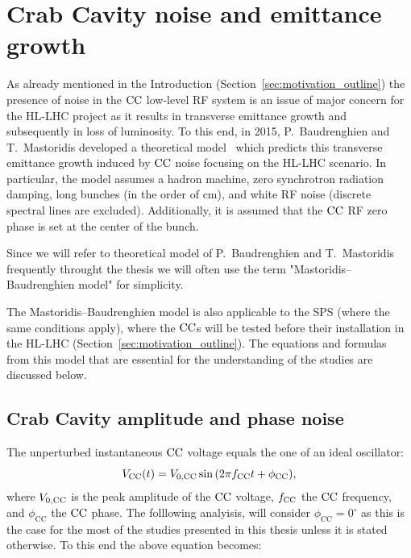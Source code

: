 

\section{Crab Cavity noise and emittance growth}\label{sec:CC_noise_intro}
As already mentioned in the Introduction (Section~\ref{sec:motivation_outline}) the presence of noise in the ${\mathrm{CC}}$ low-level RF system is an issue of major concern for the HL-LHC project as it results in transverse emittance growth and subsequently in loss of luminosity. To this end, in 2015, P.~Baudrenghien and T.~Mastoridis developed a theoretical model~\cite{PhysRevSTAB.18.101001} which predicts this transverse emittance growth induced by ${\mathrm{CC}}$ noise focusing on the HL-LHC scenario. In particular, the model assumes a hadron machine, zero synchrotron radiation damping, long bunches (in the order of cm), and white RF noise (discrete spectral lines are excluded). Additionally, it is assumed that the ${\mathrm{CC}}$ RF zero phase is set at the center of the bunch.

Since we will refer to theoretical model of P.~Baudrenghien and T.~Mastoridis ~\cite{PhysRevSTAB.18.101001} frequently throught the thesis we will often use the term "Mastoridis--Baudrenghien model" for simplicity.

The Mastoridis--Baudrenghien model is also applicable to the SPS (where the same conditions apply), where the ${\mathrm{CC}}$s will be tested before their installation in the HL-LHC (Section~\ref{sec:motivation_outline}). The equations and formulas from this model that are essential for the understanding of the studies are discussed below.




\subsection{Crab Cavity amplitude and phase noise}\label{subsec:AN_PN}
The unperturbed instantaneous ${\mathrm{CC}}$ voltage equals the one of an ideal oscillator:
\begin{equation}\label{eq:CC_voltage_t_phase}
    V_\mathrm{CC}(t) = {V_\mathrm{0, CC}} \sin{\left ( 2 \pi {f_\mathrm{CC}}t + \phi_\mathrm{CC} \right )},
\end{equation}
where ${V_\mathrm{0, CC}}$ is the peak amplitude of the ${\mathrm{CC}}$ voltage, ${f_\mathrm{CC}}$ the ${\mathrm{CC}}$ frequency, and $\phi_\mathrm{CC}$ the ${\mathrm{CC}}$ phase. The folllowing analyisis, will consider $\phi_\mathrm{CC}=0^\circ$ as this is the case for the most of the studies presented in this thesis unless it is stated otherwise. To this end the above equation becomes: 

